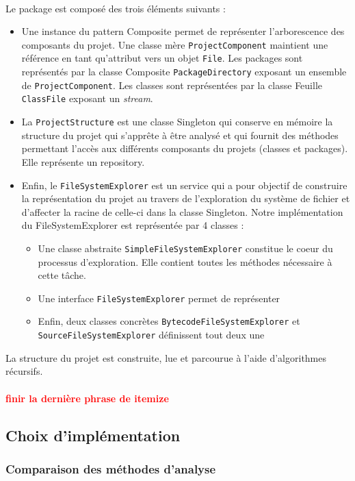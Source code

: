 \documentclass{scrartcl}
\newcommand{\TODO}[1] {
    \noindent \paragraph{\textcolor{red}{#1}}
}
\begin{document}
	\paragraph{}Le package est composé des trois éléments suivants :
	\begin{itemize}
		\item Une instance du pattern Composite permet de représenter l’arborescence des composants du projet. Une classe mère \texttt{ProjectComponent} maintient une référence en tant qu’attribut vers un objet \texttt{File}. Les packages sont représentés par la classe Composite \texttt{PackageDirectory} exposant un ensemble de \texttt{ProjectComponent}. Les classes sont représentées par la classe Feuille \texttt{ClassFile} exposant un \emph{stream}.
		\item La \texttt{ProjectStructure} est une classe Singleton qui conserve en mémoire la structure du projet qui s’apprête à être analysé et qui fournit des méthodes permettant l’accès aux différents composants du projets (classes et packages). Elle représente un repository.
		\item Enfin, le \texttt{FileSystemExplorer} est un service qui a pour objectif de construire la représentation du projet au travers de l'exploration du système de fichier et d’affecter la racine de celle-ci dans la classe Singleton. Notre implémentation du FileSystemExplorer est représentée par 4 classes : 
		\begin{itemize}
		    \item Une classe abstraite \texttt{SimpleFileSystemExplorer} constitue le coeur du processus d'exploration. Elle contient toutes les méthodes nécessaire à cette tâche.
		    \item Une interface \texttt{FileSystemExplorer} permet de représenter
		    \item Enfin, deux classes concrètes \texttt{BytecodeFileSystemExplorer} et \texttt{SourceFileSystemExplorer} définissent tout deux une 
		\end{itemize}
	\end{itemize}
    La structure du projet est construite, lue et parcourue à l'aide d’algorithmes récursifs.
    
\TODO{finir la dernière phrase de itemize}


\subsection{Choix d'implémentation}

    \subsubsection{Comparaison des méthodes d'analyse}
    \label{methodsComparison}
\end{document}
